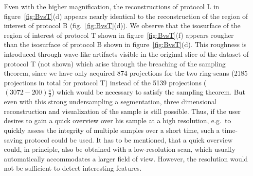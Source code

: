 Even with the higher magnification, the reconstructions of protocol L in figure~\ref{fig:BvsT}(d) appears nearly identical to the reconstruction of the region of interest of protocol B (fig.~\ref{fig:BvsT}(d)). We observe that the isosurface of the region of interest of protocol T shown in figure~\ref{fig:BvsT}(f) appears rougher than the isosurface of protocol B shown in figure~\ref{fig:BvsT}(d). This roughness is introduced through wave-like artifacts visible in the original slice of the dataset of protocol T (not shown) which arise through the breaching of the sampling theorem, since we have only acquired 874 projections for the two ring-scans (2185 projections in total for protocol T) instead of the 5139 projections ($(3072-200)\frac{\pi}{2}$) which would be necessary to satisfy the sampling theorem. But even with this strong undersampling a segmentation, three dimensional reconstruction and visualization of the sample is still possible. Thus, if the user desires to gain a quick overview over his sample at a high resolution, e.g.\ to quickly assess the integrity of multiple samples over a short time, such a time-saving protocol could be used. It has to be mentioned, that a quick overview could, in principle, also be obtained with a low-resolution scan, which usually automatically accommodates a larger field of view. However, the resolution would not be sufficient to detect interesting features.

\onecolumn

